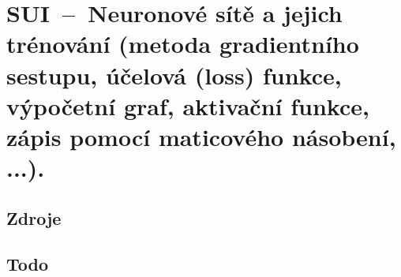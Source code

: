 

\graphicspath{{sui/neuronove_site_a_jejich_trenovani/figures}}


\chapter{SUI~--~Neuronové sítě a jejich trénování (metoda gradientního sestupu, účelová (loss) funkce, výpočetní graf, aktivační funkce, zápis pomocí maticového násobení, ...).}


\section{Zdroje}

\begin{compactitem}
    \item {}
\end{compactitem}


\section{Todo}
